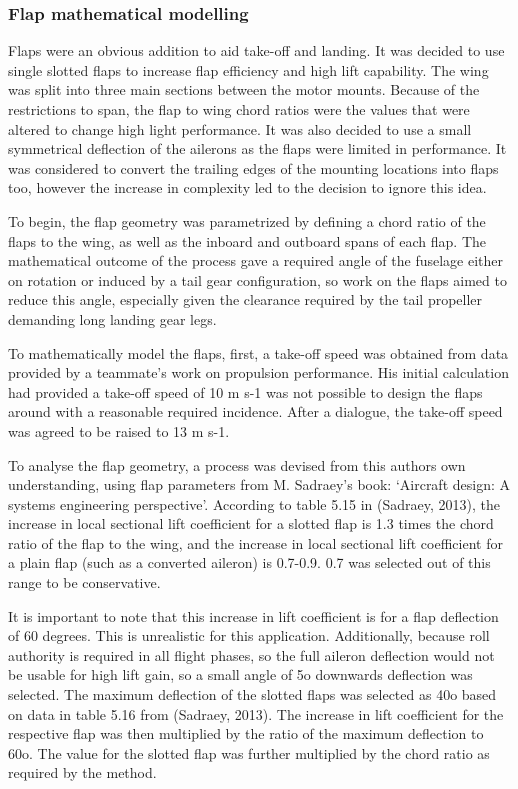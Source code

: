 \documentclass[../../main.tex]{subfiles}
\begin{document}
\subsubsection{Flap mathematical modelling} \label{sec:design-process:final-design-proposal:wing:flap-mathematical-modelling}

Flaps were an obvious addition to aid take-off and landing.
It was decided to use single slotted flaps to increase flap efficiency and high lift capability.
The wing was split into three main sections between the motor mounts.
Because of the restrictions to span, the flap to wing chord ratios were the values that were altered to change high light performance.
It was also decided to use a small symmetrical deflection of the ailerons as the flaps were limited in performance.
It was considered to convert the trailing edges of the mounting locations into flaps too, however the increase in complexity led to the decision to ignore this idea. 

To begin, the flap geometry was parametrized by defining a chord ratio of the flaps to the wing, as well as the inboard and outboard spans of each flap.
The mathematical outcome of the process gave a required angle of the fuselage either on rotation or induced by a tail gear configuration, so work on the flaps aimed to reduce this angle, especially given the clearance required by the tail propeller demanding long landing gear legs. 

To mathematically model the flaps, first, a take-off speed was obtained from data provided by a teammate’s work on propulsion performance.
His initial calculation had provided a take-off speed of 10 m s-1 was not possible to design the flaps around with a reasonable required incidence.
After a dialogue, the take-off speed was agreed to be raised to 13 m s-1. 

To analyse the flap geometry, a process was devised from this authors own understanding, using flap parameters from M.
Sadraey’s book: ‘Aircraft design: A systems engineering perspective’.
According to table 5.15 in (Sadraey, 2013), the increase in local sectional lift coefficient for a slotted flap is 1.3 times the chord ratio of the flap to the wing, and the increase in local sectional lift coefficient for a plain flap (such as a converted aileron) is 0.7-0.9. 0.7 was selected out of this range to be conservative. 

It is important to note that this increase in lift coefficient is for a flap deflection of 60 degrees.
This is unrealistic for this application.
Additionally, because roll authority is required in all flight phases, so the full aileron deflection would not be usable for high lift gain, so a small angle of 5o downwards deflection was selected.
The maximum deflection of the slotted flaps was selected as 40o based on data in table 5.16 from (Sadraey, 2013).
The increase in lift coefficient for the respective flap was then multiplied by the ratio of the maximum deflection to 60o.
The value for the slotted flap was further multiplied by the chord ratio as required by the method. 
\end{document}
